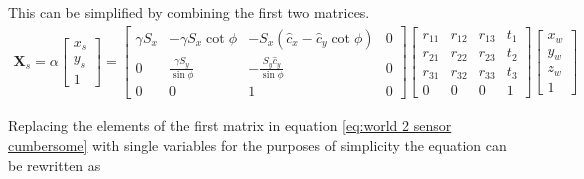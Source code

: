 This can be simplified by combining the first two matrices.
\begin{align}
	\bm{X}_s = \alpha
	\begin{bmatrix}
	x_s \\
	y_s \\
	1
	\end{bmatrix} =
	\begin{bmatrix}
	\gamma S_x & -\gamma S_x \cot \phi & -S_x \left( \hat c_x - \hat c_y \cot \phi \right) & 0\\
	0 & \frac{\gamma S_y}{\sin \phi} & -\frac{S_y \hat c_y}{\sin \phi} & 0\\
	0 & 0 & 1 & 0
	\end{bmatrix}
	\begin{bmatrix}
	r_{11} & r_{12} & r_{13} & t_1 \\
	r_{21} & r_{22} & r_{23} & t_2 \\
	r_{31} & r_{32} & r_{33} & t_3 \\
	0 & 0 & 0 & 1
	\end{bmatrix}
	\begin{bmatrix}
	x_w \\
	y_w \\
	z_w \\
	1
	\end{bmatrix}
	\label{eq:world 2 sensor cumbersome}
\end{align}

Replacing the elements of the first matrix in equation \ref{eq:world 2 sensor cumbersome} with single variables for the purposes of simplicity the equation can be rewritten as

